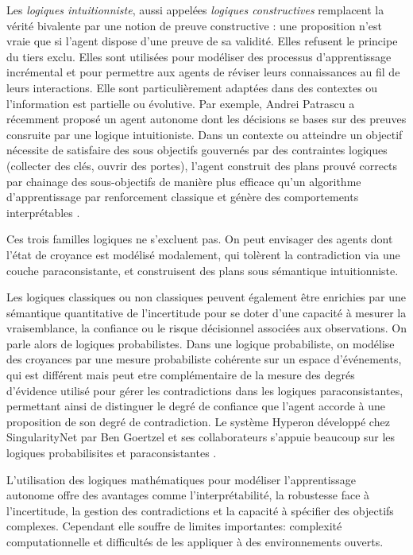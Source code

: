 Les \emph{logiques intuitionniste}, aussi appelées \emph{logiques constructives} remplacent la vérité bivalente par une notion de preuve constructive : une proposition n’est vraie que si l’agent dispose d’une preuve de sa validité.   
Elles refusent le principe du tiers exclu.
Elles sont utilisées pour modéliser des processus d'apprentissage incrémental et pour permettre aux agents de réviser leurs connaissances au fil de leurs interactions. 
Elle sont particulièrement adaptées dans des contextes ou l'information est partielle ou évolutive.
Par exemple, Andrei Patrascu a récemment proposé un agent autonome dont les décisions se bases sur des preuves consruite par une logique intuitioniste. 
Dans un contexte ou atteindre un objectif nécessite de satisfaire des sous objectifs gouvernés par des contraintes logiques (collecter des clés, ouvrir des portes), l'agent construit des plans prouvé corrects par chainage des sous-objectifs de manière plus efficace qu'un algorithme d'apprentissage par renforcement classique et génère des comportements interprétables \cite{patrascu_constructive_2025}.

Ces trois familles logiques ne s'excluent pas. 
On peut envisager des agents dont l’état de croyance est modélisé modale­ment, qui tolèrent la contradiction via une couche paraconsistante, et construisent des plans sous sémantique intuitionniste.

Les logiques classiques ou non classiques peuvent également être enrichies par une sémantique quantitative de l'incertitude pour se doter d'une capacité à mesurer la vraisemblance, la confiance ou le risque décisionnel associées aux observations. 
On parle alors de logiques probabilistes. 
Dans une logique probabiliste, on modélise des croyances par une mesure probabiliste cohérente sur un espace d’événements, qui est différent mais peut etre complémentaire de la mesure des degrés d'évidence utilisé pour gérer les contradictions dans les logiques paraconsistantes, permettant ainsi de distinguer le degré de confiance que l'agent accorde à une proposition de son degré de contradiction. 
Le système Hyperon développé chez SingularityNet par Ben Goertzel et ses collaborateurs s'appuie beaucoup sur les logiques probabilisites et paraconsistantes \cite{goertzel_general_2021}.


L'utilisation des logiques mathématiques pour modéliser l'apprentissage autonome offre des avantages comme l'interprétabilité, la robustesse face à l'incertitude, la gestion des contradictions et la capacité à spécifier des objectifs complexes. 
Cependant elle souffre de limites importantes: complexité computationnelle et difficultés de les appliquer à des environnements ouverts. 

